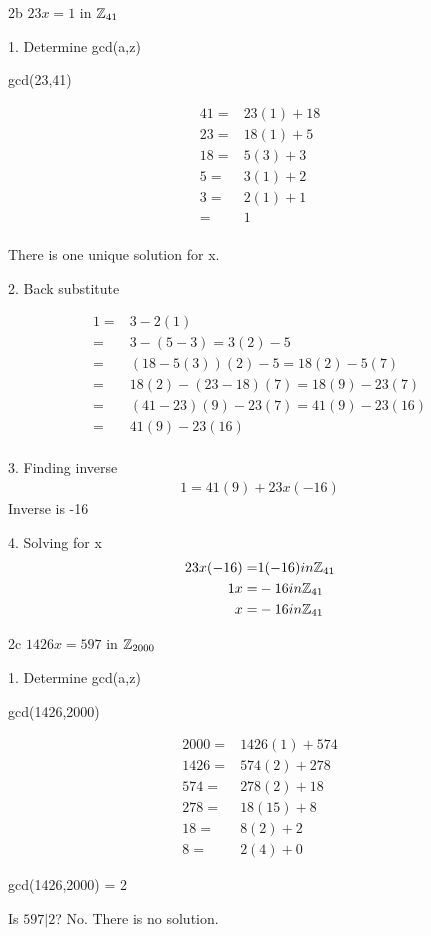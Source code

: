 \begin{question}{2b}
$23x = 1$ in $\mathbb{Z}_{41}$

1. Determine gcd(a,z)

gcd(23,41)

\begin{align*}
41 =& 23(1) +18 \\
23 =& 18(1) +5 \\
18 =& 5(3) + 3 \\
5 =& 3(1) +2 \\
3 =& 2(1) +1 \\
=& 1 \\
\end{align*}

There is one unique solution for x.

2. Back substitute

\begin{align*}
1 =& 3 - 2(1) \\
=& 3-(5-3) = 3(2)-5\\
=& (18-5(3))(2)-5 = 18(2)-5(7)\\ 
=& 18(2)-(23-18)(7) = 18(9)-23(7)\\
=& (41-23)(9)-23(7) = 41(9)-23(16)\\
=& 41(9)-23(16)\\ 
\end{align*}

3. Finding inverse
\begin{align*}
1 = 41(9) + 23x(-16)
\end{align*}
Inverse is -16

4. Solving for x
\begin{align*}
23x(-16) =& 1(-16) in \mathbb{Z}_{41}\\
1x =& -16 in \mathbb{Z}_{41}\\
x =& -16 in \mathbb{Z}_{41}
\end{align*}
\end{question}

\begin{question}{2c}
$1426x = 597$ in $\mathbb{Z}_{2000}$

1. Determine gcd(a,z)

gcd(1426,2000)

\begin{align*}
2000 =& 1426(1) + 574 \\
1426 =& 574(2) + 278 \\
574 =& 278(2) + 18 \\
278 =& 18(15) + 8 \\
18 =& 8(2) + 2 \\
8 =& 2(4) + 0
\end{align*}

gcd(1426,2000) = 2

Is $597|2$? No. There is no solution.
\end{question}

